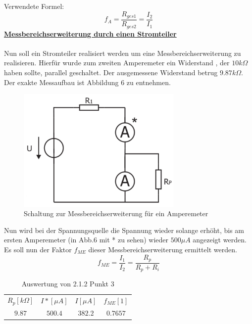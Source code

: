 \documentclass[a4paper,12pt]{article}
\begin{document}
	\noindent
	Verwendete Formel:
	\[
		f_A = \frac{R_{ges1}}{R_{ges2}} = \frac{I_2}{I_1}
	\]
	\newline
	\underline{\textbf{Messbereichserweiterung durch einen Stromteiler}}\\ \\
	Nun soll ein Stromteiler realisiert werden um eine Messbereichserweiterung zu realisieren. Hierfür wurde zum zweiten Amperemeter ein Widerstand , der $10k\Omega$ haben sollte, parallel geschaltet. Der ausgemessene Widerstand betrug $9.87k\Omega$. Der exakte Messaufbau ist Abbildung 6 zu entnehmen.
	\begin{figure}[h]
		\centering
		\includegraphics[width=8cm]{img/Messbereich_Amperemeter}
		\caption{Schaltung zur Messbereichserweiterung für ein Amperemeter}
	\end{figure}
	\newline
	Nun wird bei der Spannungsquelle die Spannung wieder solange erhöht, bis am ersten Amperemeter (in Abb.6 mit * zu sehen) wieder $500\mu A$ angezeigt werden. Es soll nun der Faktor $f_{ME}$ dieser Messbereichserweiterung ermittelt werden.
	\[
		f_{ME} = \frac{I_1}{I_2} = \frac{R_p}{R_p + R_i}
	\]
	\newpage
	\begin{table}[h]
		\centering
		\begin{tabular}{|c|c|c|c|}
			\hline
			\multirow{2}{*}{$R_p[k\Omega]$} & \multirow{2}{*}{$I*[\mu A]$} & \multirow{2}{*}{$I[\mu A]$} & \multirow{2}{*}{$f_{ME}[1]$} \\
			&  &  &  \\ \hline
			\multirow{2}{*}{$9.87$} & \multirow{2}{*}{$500.4$} & \multirow{2}{*}{$382.2$} & \multirow{2}{*}{$0.7657$} \\
			&  &  &  \\ \hline
		\end{tabular}
		\caption{Auswertung von 2.1.2 Punkt 3}
	\end{table}
\end{document}
